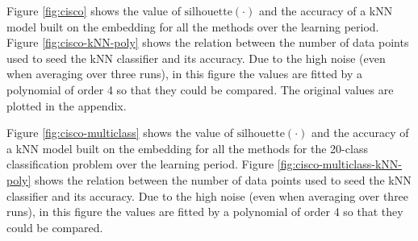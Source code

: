 Figure \ref{fig:cisco} shows the value of \( \mathrm{silhouette} \left( \cdot \right) \) and the accuracy of a kNN model built on the embedding for all the methods over the learning period. Figure \ref{fig:cisco-kNN-poly} shows the relation between the number of data points used to seed the kNN classifier and its accuracy. Due to the high noise (even when averaging over three runs), in this figure the values are fitted by a polynomial of order 4 so that they could be compared. The original values are plotted in the appendix.

Figure \ref{fig:cisco-multiclass} shows the value of \( \mathrm{silhouette} \left( \cdot \right) \) and the accuracy of a kNN model built on the embedding for all the methods for the 20-class classification problem over the learning period. Figure \ref{fig:cisco-multiclass-kNN-poly} shows the relation between the number of data points used to seed the kNN classifier and its accuracy. Due to the high noise (even when averaging over three runs), in this figure the values are fitted by a polynomial of order 4 so that they could be compared.


